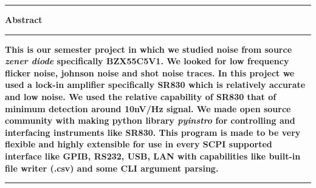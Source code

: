 \begin{table}[hbt!]\centering
  \parbox[h]{.75\textwidth}{\centering \hrule \vskip10pt\Large \textbf{Abstract} \vskip10pt \hrule \vskip10pt}
  \parbox[h]{.75\textwidth}{\normalsize \textbf{
       This is our semester project in which we studied noise from source \emph{zener diode} specifically BZX55C5V1. We looked for low frequency flicker noise, johnson noise and shot noise traces. In this project we used a lock-in amplifier specifically SR830 which is relatively accurate and low noise. We used the relative capability of SR830 that of minimum detection around 10nV/Hz signal. We made open source community with making python library \emph{pyinstro} for controlling and interfacing instruments like SR830. This program is made to be very flexible and highly extensible for use in every SCPI supported interface like GPIB, RS232, USB, LAN with capabilities like built-in file writer (.csv) and some CLI argument parsing.} \vskip10pt \hrule \vskip10pt}
\end{table}
\clearpage
\begin{table}[hbt!]\centering
\vskip100pt
\parbox[h]{.75\textwidth}{\tableofcontents}
\end{table}
\clearpage
